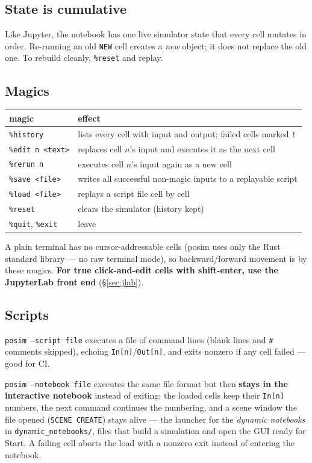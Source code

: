 \documentclass[11pt]{article}
\newcommand{\kw}[1]{\texttt{\uppercase{#1}}}
\newcommand{\code}[1]{\texttt{#1}}
\begin{document}
\subsection{State is cumulative}
Like Jupyter, the notebook has one live simulator state that every cell
mutates in order. Re-running an old \kw{new} cell creates a \emph{new}
object; it does not replace the old one. To rebuild cleanly,
\code{\%reset} and replay.

\subsection{Magics}\label{sec:magics}
\begin{center}
\begin{tabular}{lp{9.8cm}}
\textbf{magic} & \textbf{effect}\\\hline
\code{\%history} & lists every cell with input and output; failed cells marked \code{!}\\
\code{\%edit n <text>} & replaces cell $n$'s input and executes it as the next cell\\
\code{\%rerun n} & executes cell $n$'s input again as a new cell\\
\code{\%save <file>} & writes all successful non-magic inputs to a replayable script\\
\code{\%load <file>} & replays a script file cell by cell\\
\code{\%reset} & clears the simulator (history kept)\\
\code{\%quit}, \code{\%exit} & leave\\
\end{tabular}
\end{center}

A plain terminal has no cursor-addressable cells (posim uses only the
Rust standard library --- no raw terminal mode), so backward/forward
movement is by these magics. \textbf{For true click-and-edit cells with
shift-enter, use the JupyterLab front end} (\S\ref{sec:jlab}).

\subsection{Scripts}
\code{posim --script file} executes a file of command lines (blank lines
and \code{\#} comments skipped), echoing \code{In[n]}/\code{Out[n]}, and
exits nonzero if any cell failed --- good for CI.

\code{posim --notebook file} executes the same file format but then
\textbf{stays in the interactive notebook} instead of exiting: the
loaded cells keep their \code{In[n]} numbers, the next command
continues the numbering, and a scene window the file opened
(\code{SCENE CREATE}) stays alive --- the launcher for the
\emph{dynamic notebooks} in \code{dynamic\_notebooks/}, files that
build a simulation and open the GUI ready for Start. A failing cell
aborts the load with a nonzero exit instead of entering the notebook.
\end{document}
